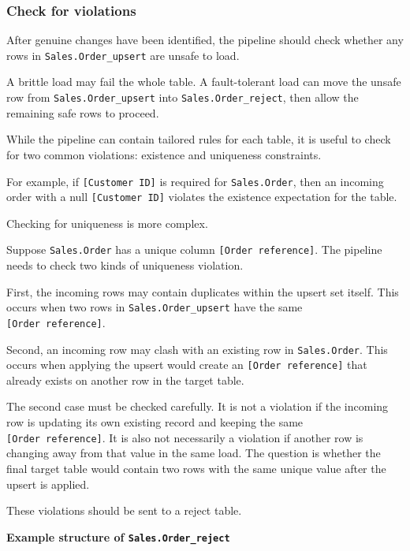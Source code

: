 \documentclass[10pt,openany,10pt]{book}
\begin{document}
\subsubsection{Check for violations}\label{check-for-violations}

After genuine changes have been identified, the pipeline should check
whether any rows in \texttt{Sales.Order\_upsert} are unsafe to load.

A brittle load may fail the whole table. A fault-tolerant load can move
the unsafe row from \texttt{Sales.Order\_upsert} into
\texttt{Sales.Order\_reject}, then allow the remaining safe rows to
proceed.

While the pipeline can contain tailored rules for each table, it is
useful to check for two common violations: existence and uniqueness
constraints.

For example, if \texttt{{[}Customer\ ID{]}} is required for
\texttt{Sales.Order}, then an incoming order with a null
\texttt{{[}Customer\ ID{]}} violates the existence expectation for the
table.

Checking for uniqueness is more complex.

Suppose \texttt{Sales.Order} has a unique column
\texttt{{[}Order\ reference{]}}. The pipeline needs to check two kinds
of uniqueness violation.

First, the incoming rows may contain duplicates within the upsert set
itself. This occurs when two rows in \texttt{Sales.Order\_upsert} have
the same \texttt{{[}Order\ reference{]}}.

Second, an incoming row may clash with an existing row in
\texttt{Sales.Order}. This occurs when applying the upsert would create
an \texttt{{[}Order\ reference{]}} that already exists on another row in
the target table.

The second case must be checked carefully. It is not a violation if the
incoming row is updating its own existing record and keeping the same
\texttt{{[}Order\ reference{]}}. It is also not necessarily a violation
if another row is changing away from that value in the same load. The
question is whether the final target table would contain two rows with
the same unique value after the upsert is applied.

These violations should be sent to a reject table.

\textbf{Example structure of \texttt{Sales.Order\_reject}}
\end{document}

